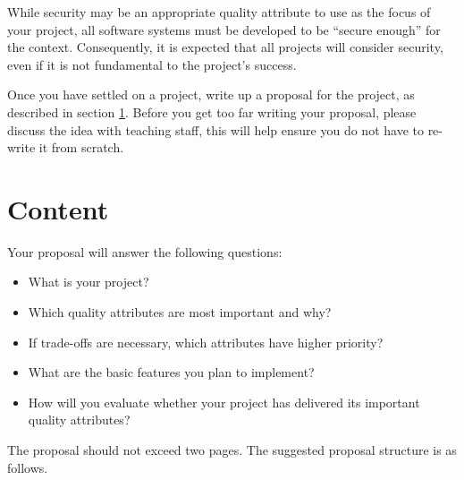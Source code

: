 \documentclass{csse4400}
\begin{document}
\noindent
While security may be an appropriate quality attribute to use as the focus of your project,
all software systems must be developed to be ``secure enough'' for the context.
Consequently, it is expected that all projects will consider security,
even if it is not fundamental to the project's success.

Once you have settled on a project, write up a proposal for the project, as described in section \ref{sect:content}.
Before you get too far writing your proposal,
please discuss the idea with teaching staff,
this will help ensure you do not have to re-write it from scratch.


\section{Content}\label{sect:content}
Your proposal will answer the following questions:
\begin{itemize}
    \item What is your project?
    \item Which quality attributes are most important and why?
    \item If trade-offs are necessary, which attributes have higher priority?
    \item What are the basic features you plan to implement?
    \item How will you evaluate whether your project has delivered its important quality attributes?
\end{itemize}

\noindent
The proposal should not exceed two pages.
The suggested proposal structure is as follows.
\end{document}
